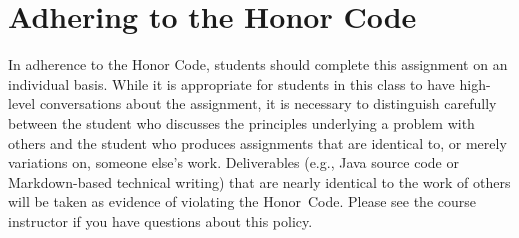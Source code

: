 \documentclass[11pt]{article}
\begin{document}
\section*{Adhering to the Honor Code}

In adherence to the Honor Code, students should complete this assignment on an individual basis. While it is appropriate
for students in this class to have high-level conversations about the assignment, it is necessary to distinguish
carefully between the student who discusses the principles underlying a problem with others and the student who produces
assignments that are identical to, or merely variations on, someone else's work. Deliverables (e.g., Java source code or
Markdown-based technical writing) that are nearly identical to the work of others will be taken as evidence of violating
the \mbox{Honor Code}. Please see the course instructor if you have questions about this policy.
\end{document}
